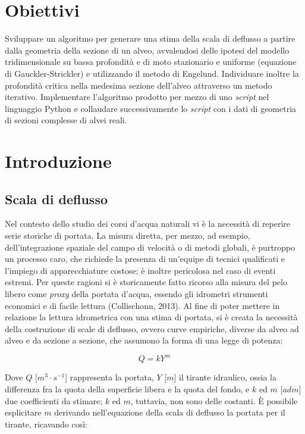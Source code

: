 \documentclass[12pt]{article} %
\begin{document}
\newpage
\thispagestyle{empty}
\tableofcontents
\newpage
\listoffigures
\newpage

\section{Obiettivi}
\noindent Sviluppare un algoritmo per generare una stima della scala di deflusso a partire dalla geometria della sezione di un alveo, avvalendosi delle ipotesi del modello tridimensionale su bassa profondità e di moto stazionario e uniforme (equazione di Gauckler-Strickler) e utilizzando il metodo di Engelund. Individuare inoltre la profondità critica nella medesima sezione dell’alveo attraverso un metodo iterativo. Implementare l’algoritmo prodotto per mezzo di uno \textit{script} nel linguaggio Python e collaudare successivamente lo \textit{script} con i dati di geometria di sezioni complesse di alvei reali.

\newpage
\section{Introduzione}
\subsection{Scala di deflusso}
\noindent Nel contesto dello studio dei corsi d’acqua naturali vi è la necessità di reperire serie storiche di portata. La misura diretta, per mezzo, ad esempio, dell’integrazione spaziale del campo di velocità o di metodi globali, è purtroppo un processo caro, che richiede la presenza di un’equipe di tecnici qualificati e l’impiego di apparecchiature costose; è inoltre pericolosa nel caso di eventi estremi. 
Per queste ragioni si è storicamente fatto ricorso alla misura del pelo libero come \textit{proxy} della portata d’acqua, essendo gli idrometri strumenti economici e di facile lettura (Collischonn, 2013).
Al fine di poter mettere in relazione la lettura idrometrica con una stima di portata, si è creata la necessità della costruzione di scale di deflusso, ovvero curve empiriche, diverse da alveo ad alveo e da sezione a sezione, che assumono la forma di una legge di potenza: 

\begin{equation}
    Q=kY^m
    \label{eqn:scala_deflusso}
\end{equation}

\noindent Dove $Q$ [$m^3\cdot s^{-1}$]  rappresenta la portata, $Y$ [$m$] il tirante idraulico, ossia la differenza fra la quota della superficie libera e la quota del fondo, e $k$ ed $m$ [$adm]$ due coefficienti da stimare; $k$ ed $m$, tuttavia, non sono delle costanti. È possibile esplicitare $m$ derivando nell’equazione della scala di deflusso la portata per il tirante, ricavando così: 
\end{document}
